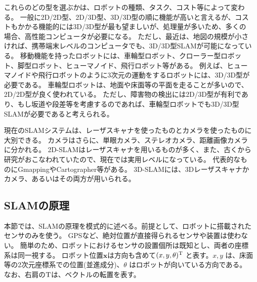 \begin{table}[h]
  \centering
  \caption{SLAMの種類}
\end{table}

これらのどの型を選ぶかは、ロボットの種類、タスク、コスト等によって変わる。
一般に2D/2D型、2D/3D型、3D/3D型の順に機能が高いと言えるが、コストもかかる機能的には3D/3D型が最も望ましいが、処理量が多いため、多くの場合、高性能コンピュータが必要になる。
ただし、最近は、地図の規模が小さければ、携帯端末レベルのコンピュータでも、3D/3D型SLAMが可能になっている。
移動機能を持ったロボットには、車輪型ロボット、クローラー型ロボット、脚型ロボット、ヒューマノイド、飛行ロボット等がある。
例えば、ヒューマノイドや飛行ロボットのように3次元の運動をするロボットには、3D/3D型が必要である。
車輪型ロボットは、地面や床面等の平面を走ることが多いので、2D/2D型が良く使われている。
ただし、障害物の検出には2D/3D型が有利であり、もし坂道や段差等を考慮するのであれば、車輪型ロボットでも3D/3D型SLAMが必要であると考えられる。

現在のSLAMシステムは、レーザスキャナを使ったものとカメラを使ったものに大別できる。
カメラはさらに、単眼カメラ、ステレオカメラ、距離画像カメラに分かれる。
2D-SLAMはレーザスキャナを用いるものが多く、また、古くから研究がおこなわれていたので、現在では実用レベルになっている。
代表的なものにGmapping\cite{slam:gmapping}やCartographer\cite{slam:cartographer}等がある。
3D-SLAMには、3Dレーザスキャナかカメラ、あるいはその両方が用いられる。

\subsection{SLAMの原理}
本節では、SLAMの原理を模式的に述べる。前提として、ロボットに搭載されたセンサのみを使う。
GPSなど、絶対位置が直接得られるセンサや装置は使わない。
簡単のため、ロボットにおけるセンサの設置個所は既知とし、両者の座標系は同一視する。
ロボット位置$\bm{x}$は方向も含めて$(x,y,\theta)^{\rm{T}}$ と表す。$x,y$ は、床面等の2次元座標系での位置(並進成分)、$\theta$ はロボットが向いている方向である。
なお、右肩の$\rm{T}$は、ベクトルの転置を表す。

